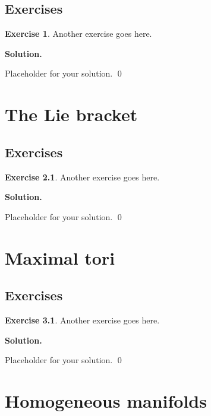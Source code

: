 \documentclass[12pt]{book}
\theoremstyle{definition}
\newtheorem{exercise}{Exercise}[chapter]
\newenvironment{solution}
{%
  \par\noindent\textbf{Solution.}\quad
}
{%
  \qed\par
}
\begin{document}
\section{Exercises}

\begin{exercise}
Another exercise goes here.
\end{exercise}

\begin{solution}
Placeholder for your solution.
\end{solution}

\chapter{The Lie bracket}
\section{Exercises}

\begin{exercise}
Another exercise goes here.
\end{exercise}

\begin{solution}
Placeholder for your solution.
\end{solution}

\chapter{Maximal tori}
\section{Exercises}

\begin{exercise}
Another exercise goes here.
\end{exercise}

\begin{solution}
Placeholder for your solution.
\end{solution}

\chapter{Homogeneous manifolds}
\end{document}
